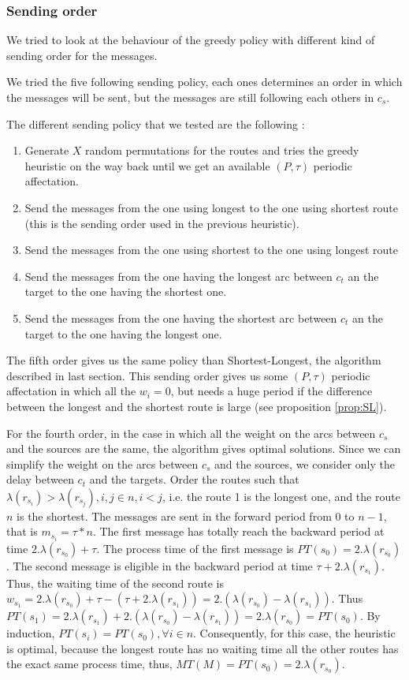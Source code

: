 \documentclass[a4paper,10pt]{article}
\begin{document}
     \subsubsection{Sending order}
     
	We tried to look at the behaviour of the greedy policy with different kind of sending order for the messages.
	
	We tried the five following sending policy, each ones determines an order in which the messages will be sent, but the messages are still following each others in $c_s$.
	
	The different sending policy that we tested are the following :
	\begin{enumerate}
	 \item Generate $X$ random permutations for the routes and tries the greedy heuristic on the way back until we get an available $(P,\tau)$ periodic affectation.
	 \item Send the messages from the one using longest to the one using shortest route (this is the sending order used in the previous heuristic).
	 \item Send the messages from the one using shortest to the one using longest route
	 \item Send the messages from the one having the longest arc between $c_t$ an the target to the one having the shortest one.
	 \item Send the messages from the one having the shortest arc between $c_t$ an the target to the one having the longest one.
	\end{enumerate}
	
	The fifth order gives us the same policy than Shortest-Longest, the algorithm described in last section. This sending order gives us some $(P,\tau)$ periodic affectation in which all the $w_i = 0$, but needs a huge period if the difference between the longest and the shortest route is large (see proposition \ref{prop:SL}).

	For the fourth order, in the case in which all the weight on the arcs between $c_s$ and the sources are the same, the algorithm gives optimal solutions.
	Since we can simplify the weight on the arcs between $c_s$ and the sources, we consider only the delay between $c_t$ and the targets. Order the routes such that $\lambda(r_{s_i}) > \lambda(r_{s_j}), i,j \in n, i<j$, i.e. the route 1 is the longest one, and the route $n$ is the shortest.
	The messages are sent in the forward period from 0 to $n-1$, that is $m_{s_i} = \tau * n$.
	The first message has totally reach the backward period at time $2.\lambda(r_{s_0})+\tau$. The process time of the first message is $PT(s_0) = 2.\lambda(r_{s_0}) $.
	The second message is eligible in the backward period at time $\tau + 2.\lambda(r_{s_1})$. Thus, the waiting time of the second route is $w_{s_1} = 2.\lambda(r_{s_0})+\tau - (\tau + 2.\lambda(r_{s_1})) = 2.(\lambda(r_{s_0}) - \lambda(r_{s_1}))$. Thus $PT(s_1) = 2.\lambda(r_{s_1}) + 2.(\lambda(r_{s_0}) - \lambda(r_{s_1}))  = 2.\lambda(r_{s_0})  = PT(s_0)$.
	By induction, $PT(s_i) = PT(s_0), \forall i \in n$. 
	Consequently, for this case, the heuristic is optimal, because the longest route has no waiting time all the other routes has the exact same process time, thus, $MT(M) = PT(s_0) = 2.\lambda(r_{s_0}) $.
\end{document}
